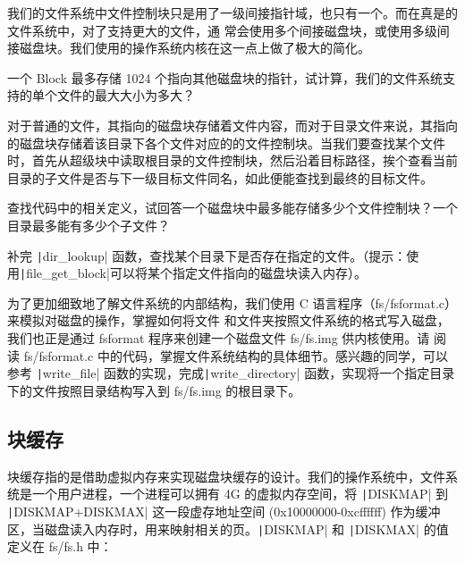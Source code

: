 \begin{note}
我们的文件系统中文件控制块只是用了一级间接指针域，也只有一个。而在真是的文件系统中，对了支持更大的文件，通
常会使用多个间接磁盘块，或使用多级间接磁盘块。我们使用的操作系统内核在这一点上做了极大的简化。
\end{note}

\begin{thinking}\label{think-filesize}
一个 Block 最多存储 1024 个指向其他磁盘块的指针，试计算，我们的文件系统支持的单个文件的最大大小为多大？
\end{thinking}

对于普通的文件，其指向的磁盘块存储着文件内容，而对于目录文件来说，其指向的磁盘块存储着该目录下各个文件对应的的文件控制块。当我们要查找某个文件时，首先从超级块中读取根目录的文件控制块，然后沿着目标路径，挨个查看当前目录的子文件是否与下一级目标文件同名，如此便能查找到最终的目标文件。

\begin{thinking}\label{think-filenum}
查找代码中的相关定义，试回答一个磁盘块中最多能存储多少个文件控制块？一个目录最多能有多少个子文件？
\end{thinking}

\begin{exercise}
补完 \texttt|dir_lookup| 函数，查找某个目录下是否存在指定的文件。（提示：使用\texttt|file_get_block|可以将某个指定文件指向的磁盘块读入内存）。
\end{exercise}

为了更加细致地了解文件系统的内部结构，我们使用 C 语言程序（fs/fsformat.c）来模拟对磁盘的操作，掌握如何将文件
和文件夹按照文件系统的格式写入磁盘，我们也正是通过 fsformat 程序来创建一个磁盘文件 fs/fs.img 供内核使用。请
阅读 fs/fsformat.c 中的代码，掌握文件系统结构的具体细节。感兴趣的同学，可以参考 \texttt|write_file|
函数的实现，完成\texttt|write_directory| 函数，实现将一个指定目录下的文件按照目录结构写入到
fs/fs.img 的根目录下。

\subsection{块缓存}

块缓存指的是借助虚拟内存来实现磁盘块缓存的设计。我们的操作系统中，文件系统是一个用户进程，一个进程可以拥有 4G 
的虚拟内存空间，将 \texttt|DISKMAP| 到 \texttt|DISKMAP+DISKMAX| 这一段虚存地址空间
(0x10000000-0xcffffff) 作为缓冲区，当磁盘读入内存时，用来映射相关的页。\texttt|DISKMAP| 和
\texttt|DISKMAX| 的值定义在 fs/fs.h 中：


